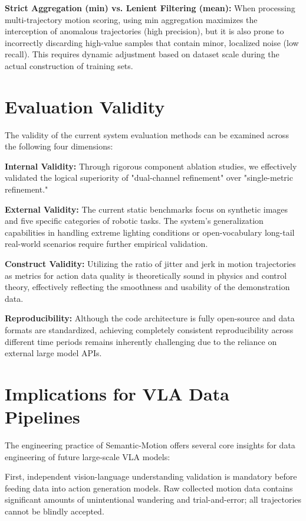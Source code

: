 \documentclass[11pt,oneside]{report}
\begin{document}
\textbf{Strict Aggregation (min) vs. Lenient Filtering (mean):} When processing multi-trajectory motion scoring, using min aggregation maximizes the interception of anomalous trajectories (high precision), but it is also prone to incorrectly discarding high-value samples that contain minor, localized noise (low recall). This requires dynamic adjustment based on dataset scale during the actual construction of training sets.

\section{Evaluation Validity}
The validity of the current system evaluation methods can be examined across the following four dimensions:

\textbf{Internal Validity:} Through rigorous component ablation studies, we effectively validated the logical superiority of "dual-channel refinement" over "single-metric refinement."

\textbf{External Validity:} The current static benchmarks focus on synthetic images and five specific categories of robotic tasks. The system's generalization capabilities in handling extreme lighting conditions or open-vocabulary long-tail real-world scenarios require further empirical validation.

\textbf{Construct Validity:} Utilizing the ratio of jitter and jerk in motion trajectories as metrics for action data quality is theoretically sound in physics and control theory, effectively reflecting the smoothness and usability of the demonstration data.

\textbf{Reproducibility:} Although the code architecture is fully open-source and data formats are standardized, achieving completely consistent reproducibility across different time periods remains inherently challenging due to the reliance on external large model APIs.

\section{Implications for VLA Data Pipelines}
The engineering practice of Semantic-Motion offers several core insights for data engineering of future large-scale VLA models:

First, independent vision-language understanding validation is mandatory before feeding data into action generation models. Raw collected motion data contains significant amounts of unintentional wandering and trial-and-error; all trajectories cannot be blindly accepted.
\end{document}
